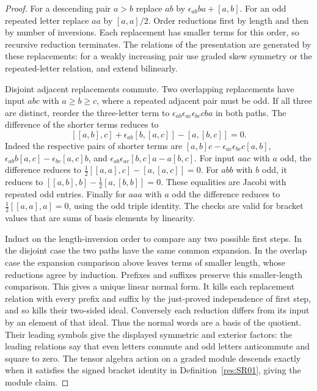 \documentclass[11pt,oneside,openany]{book}
\theoremstyle{definition}
\theoremstyle{remark}
\begin{document}
\begin{proof}
For a descending pair \(a>b\) replace \(ab\) by
\(\epsilon_{ab}ba+[a,b]\). For an odd repeated letter
replace \(aa\) by \([a,a]/2\). Order reductions first
by length and then by number of inversions. Each
replacement has smaller terms for this order, so
recursive reduction terminates. The relations of the
presentation are generated by these replacements:
for a weakly increasing pair use graded skew symmetry
or the repeated-letter relation, and extend bilinearly.

Disjoint adjacent replacements commute. Two overlapping
replacements have input \(abc\) with \(a\ge b\ge c\),
where a repeated adjacent pair must be odd. If all
three are distinct, reorder the three-letter term to
\(\epsilon_{ab}\epsilon_{ac}\epsilon_{bc}cba\) in
both paths. The difference of the shorter terms reduces
to
\[
 [[a,b],c]+\epsilon_{ab}[b,[a,c]]-[a,[b,c]]=0.
\]
Indeed the respective pairs of shorter terms are
\([a,b]c-\epsilon_{ac}\epsilon_{bc}c[a,b]\),
\(\epsilon_{ab}b[a,c]-\epsilon_{bc}[a,c]b\), and
\(\epsilon_{ab}\epsilon_{ac}[b,c]a-a[b,c]\).
For input \(aac\) with \(a\) odd, the difference reduces to
\(\tfrac12[[a,a],c]-[a,[a,c]]=0\).
For \(abb\) with \(b\) odd, it reduces to
\([[a,b],b]-\tfrac12[a,[b,b]]=0\).
These equalities are Jacobi with repeated odd entries.
Finally for \(aaa\) with \(a\) odd the difference reduces to
\(\tfrac12[[a,a],a]=0\), using the odd triple identity.
The checks are valid for bracket values that are sums of
basis elements by linearity.

Induct on the length-inversion order to compare any two possible
first steps. In the disjoint case the two paths have the same
common expansion. In the overlap case the expansion comparison
above leaves terms of smaller length, whose reductions agree by
induction. Prefixes and suffixes preserve this smaller-length
comparison. This gives a unique linear normal form. It kills
each replacement relation with every prefix and suffix by
the just-proved independence of first step, and so kills
their two-sided ideal. Conversely each reduction differs
from its input by an element of that ideal. Thus the normal
words are a basis of the quotient. Their leading symbols
give the displayed symmetric and exterior factors:
the leading relations say that even letters commute and
odd letters anticommute and square to zero. The tensor
algebra action on a graded module descends exactly when it
satisfies the signed bracket identity in
Definition~\ref{res:SR01}, giving the module claim.
\end{proof}
\end{document}
